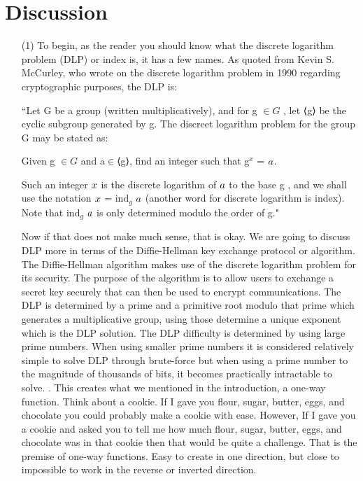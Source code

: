 \documentclass{article}
\begin{document}
\section{Discussion}
\begin{itemize}

    \item[(1)] To begin, as the reader you should know what the discrete logarithm problem (DLP) or index is, it has a few names. As quoted from Kevin S. McCurley,  who wrote on the discrete logarithm problem in 1990 regarding cryptographic purposes, the DLP is:
    \begin{displayquote}   
        “Let G be a group (written multiplicatively), and for g $ \in G$ , let ⟨g⟩ be the cyclic subgroup generated by g. The discreet logarithm problem for the group G may be stated as:
    \begin{displayquote}
	        Given g $ \in G$ and a$ \in  $⟨g⟩, find an integer such that g$^x$ = $\mathnormal{a}$.
	\end{displayquote}
        Such an integer $\mathnormal{x}$ is the discrete logarithm of $\mathnormal{a}$ to the base g , and we shall use the notation $\mathnormal{x}$ = ind$_g$ $\mathnormal{a}$ (another word for discrete logarithm is index). Note that ind$_g$ $\mathnormal{a}$ is only determined modulo the order of g."
    \end{displayquote}
    Now if that does not make much sense, that is okay. We are going to discuss DLP more in terms of the Diffie-Hellman key exchange protocol or algorithm. The Diffie-Hellman algorithm makes use of the discrete logarithm problem for its security. The purpose of the algorithm is to allow users to exchange a secret key securely that can then be used to encrypt communications. The DLP is determined by a prime and a primitive root modulo that prime which generates a multiplicative group, using those determine a unique exponent which is the DLP solution. The DLP difficulty is determined by using large prime numbers. When using smaller prime numbers it is considered relatively simple to solve DLP through brute-force but when using a prime number to the magnitude of thousands of bits, it becomes practically intractable to solve. . This creates what we mentioned in the introduction, a one-way function. Think about a cookie. If I gave you flour, sugar, butter, eggs, and chocolate you could probably make a cookie with ease. However, If I gave you a cookie and asked you to tell me how much flour, sugar, butter, eggs, and chocolate was in that cookie then that would be quite a challenge. That is the premise of one-way functions. Easy to create in one direction, but close to impossible to work in the reverse or inverted direction.   \\
    

\end{itemize}
\end{document}
